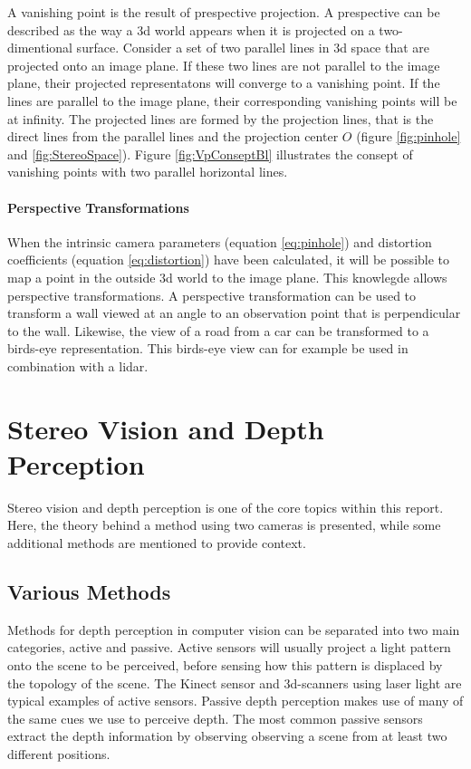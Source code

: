 A vanishing point is the result of prespective projection. A prespective can be described as the way a 3d world appears when it is projected on a two-dimentional surface. Consider a set of two parallel lines in 3d space that are projected onto an image plane. If these two lines are not parallel to the image plane, their projected representatons will converge to a vanishing point. If the lines are parallel to the image plane, their corresponding vanishing points will be at infinity. The projected lines are formed by the projection lines, that is the direct lines from the parallel lines and the projection center $O$ (figure \ref{fig:pinhole} and \ref{fig:StereoSpace}). Figure \ref{fig:VpConseptBl} illustrates the consept of vanishing points with two parallel horizontal lines.

\paragraph{Perspective Transformations}

When the intrinsic camera parameters (equation \eqref{eq:pinhole}) and distortion coefficients (equation \ref{eq:distortion}) have been calculated, it will be possible to map a point in the outside 3d world to the image plane. This knowlegde allows perspective transformations. A perspective transformation can be used to transform a wall viewed at an angle to an observation point that is perpendicular to the wall. Likewise, the view of a road from a car can be transformed to a birds-eye representation. This birds-eye view can for example be used in combination with a \gls{lidar}\cite{oreillycv}.

\section{Stereo Vision and Depth Perception}

Stereo vision and depth perception is one of the core topics within this report. Here, the theory behind a method using two cameras is presented, while some additional methods are mentioned to provide context. 

\subsection{Various Methods}

Methods for depth perception in computer vision can be separated into two main categories, active and passive\cite{autorobot}. Active sensors will usually project a light pattern onto the scene to be perceived, before sensing how this pattern is displaced by the topology of the scene. The Kinect sensor and 3d-scanners using laser light are typical examples of active sensors. Passive depth perception makes use of many of the same cues we use to perceive depth. The most common passive sensors extract the depth information by observing observing a scene from at least two different positions. 

